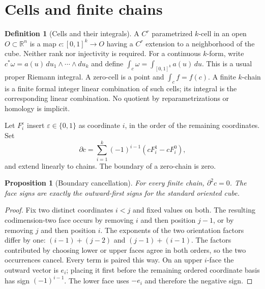 \documentclass[11pt,oneside,openany]{book}
\newtheorem{proposition}[theorem]{Proposition}
\theoremstyle{definition}
\newtheorem{definition}[theorem]{Definition}
\theoremstyle{remark}
\newcommand{\R}{\mathbb R}
\newcommand{\eps}{\varepsilon}
\newcommand{\family}[1]{}
\begin{document}
\section{Cells and finite chains}
\family{K04.15.01}\family{K04.15.02}\family{K04.15.05}
\begin{definition}[Cells and their integrals]\label{d04:15:cells}
A $C^r$ parametrized $k$-cell in an open $O\subset\R^n$ is a map
$c:[0,1]^k\to O$ having a $C^r$ extension to a neighborhood of the cube.
Neither rank nor injectivity is required. For a continuous $k$-form, write
$c^*\omega=a(u)\,du_1\wedge\cdots\wedge du_k$ and define
$\int_c\omega=\int_{[0,1]^k}a(u)\,du$. This is a usual proper Riemann
integral. A zero-cell is a point and $\int_c f=f(c)$.
A finite $k$-chain is a finite formal integer linear combination of such
cells; its integral is the corresponding linear combination. No quotient
by reparametrizations or homology is implicit.

Let $F_i^\eps$ insert $\eps\in\{0,1\}$ as coordinate $i$, in the order
of the remaining coordinates. Set
\[
 \partial c=\sum_{i=1}^k(-1)^{i-1}(cF_i^1-cF_i^0),
\]
and extend linearly to chains. The boundary of a zero-chain is zero.
\end{definition}

\begin{proposition}[Boundary cancellation]\label{d04:15:boundary-square}
For every finite chain, $\partial^2c=0$. The face signs are exactly the
outward-first signs for the standard oriented cube.
\end{proposition}
\begin{proof}
Fix two distinct coordinates $i<j$ and fixed values on both. The resulting
codimension-two face occurs by removing $i$ and then position $j-1$, or
by removing $j$ and then position $i$. The exponents of the two orientation
factors differ by one: $(i-1)+(j-2)$ and $(j-1)+(i-1)$.
The factors contributed by choosing lower or upper faces agree in both
orders, so the two occurrences cancel. Every term is paired this way.
On an upper $i$-face the outward vector is $e_i$; placing it first before
the remaining ordered coordinate basis has sign $(-1)^{i-1}$.
The lower face uses $-e_i$ and therefore the negative sign.
\end{proof}
\end{document}
